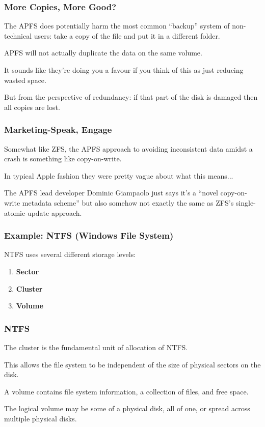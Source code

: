 \begin{frame}
	\frametitle{More Copies, More Good?}

	The APFS does potentially harm the most common ``backup'' system of non-technical users: take a copy of the file and put it in a different folder.

	APFS will not actually duplicate the data on the same volume.

	It sounds like they're doing you a favour if you think of this as just reducing wasted space.

	But from the perspective of redundancy: if that part of the disk is damaged then all copies are lost.

\end{frame}

\begin{frame}
	\frametitle{Marketing-Speak, Engage}

	Somewhat like ZFS, the APFS approach to avoiding inconsistent data amidst a crash is something like copy-on-write.

	In typical Apple fashion they were pretty vague about what this means...

	The APFS lead developer Dominic Giampaolo just says it's a ``novel copy-on-write metadata scheme'' but also somehow not exactly the same as ZFS's single-atomic-update approach.

\end{frame}


\begin{frame}
	\frametitle{Example: NTFS (Windows File System)}

	NTFS uses several different storage levels:

	\begin{enumerate}
		\item \textbf{Sector}
		\item \textbf{Cluster}
		\item \textbf{Volume}
	\end{enumerate}


\end{frame}

\begin{frame}
	\frametitle{NTFS}

	The cluster is the fundamental unit of allocation of NTFS.

	This allows the file system to be independent of the size of physical sectors on the disk.

	A volume contains file system information, a collection of files, and free space.

	The logical volume may be some of a physical disk, all of one, or spread across multiple physical disks.

\end{frame}

